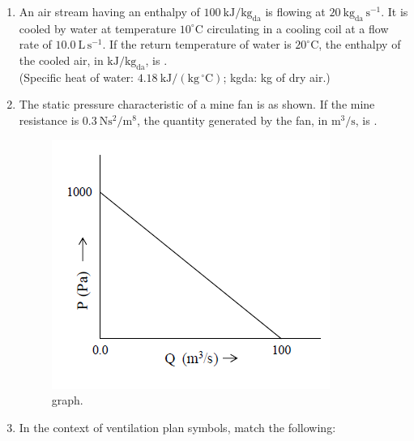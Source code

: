 \documentclass[journal]{IEEEtran}
\begin{document}
\begin{enumerate}
\hfill{}
\newpage
\item An air stream having an enthalpy of $100\ \mathrm{kJ/kg_{da}}$ is flowing at $20\ \mathrm{kg_{da}\,s^{-1}}$. 
It is cooled by water at temperature $10^{\circ}\mathrm{C}$ circulating in a cooling coil at a flow rate of 
$10.0\ \mathrm{L\,s^{-1}}$. If the return temperature of water is $20^{\circ}\mathrm{C}$, 
the enthalpy of the cooled air, in $\mathrm{kJ/kg_{da}}$, is \underline{\hspace{2cm}}.\\
{\footnotesize (Specific heat of water: $4.18\ \mathrm{kJ/(kg\,^{\circ}C)}$; kgda: kg of dry air.)}
\hfill{}
\item The static pressure characteristic of a mine fan is as shown. If the mine resistance is $0.3\ \mathrm{Ns^2/m^8}$, 
the quantity generated by the fan, in $\mathrm{m^3/s}$, is \underline{\hspace{2cm}}.\\[0.2cm]
\begin{figure}[h!]
    \centering
    \includegraphics[width=0.65\linewidth]{figs/graph.png}
    \caption{graph.}
    \label{fig:graph}
\end{figure}
\hfill{}

\item In the context of ventilation plan symbols, match the following:

\begin{center}
\begin{minipage}{0.45\linewidth}
\centering
\renewcommand{\arraystretch}{1.4}

\end{minipage}\hfill
\begin{minipage}{0.45\linewidth}
\centering
\renewcommand{\arraystretch}{1.2}

\end{minipage}
\end{center}


\end{enumerate}
\end{document}
